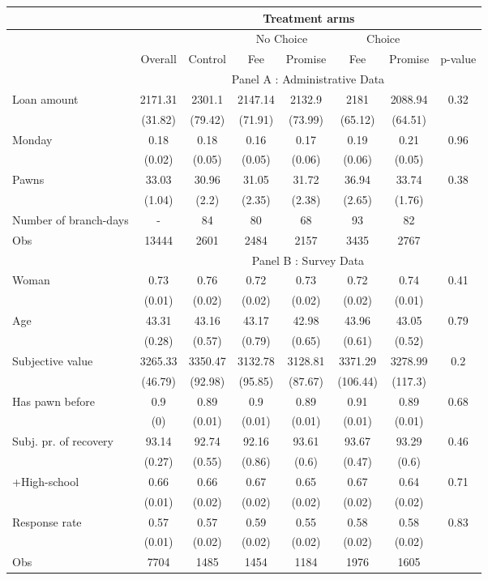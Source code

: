 \begin{tabular}{lccccccc}
\toprule
      &       & \multicolumn{5}{c}{Treatment arms}    &  \\
\midrule
      &       &       & \multicolumn{2}{c}{No Choice } & \multicolumn{2}{c}{Choice} &  \\
\midrule
\midrule
      & Overall & Control & Fee   & Promise & Fee   & Promise & p-value \\
\midrule
      & \multicolumn{7}{c}{Panel A : Administrative Data} \\
\midrule
\midrule
Loan amount  & 2171.31 & 2301.1 & 2147.14 & 2132.9 & 2181  & 2088.94 & 0.32 \\
      & (31.82) & (79.42) & (71.91) & (73.99) & (65.12) & (64.51) &  \\
Monday & 0.18  & 0.18  & 0.16  & 0.17  & 0.19  & 0.21  & 0.96 \\
      & (0.02) & (0.05) & (0.05) & (0.06) & (0.06) & (0.05) &  \\
Pawns & 33.03 & 30.96 & 31.05 & 31.72 & 36.94 & 33.74 & 0.38 \\
      & (1.04) & (2.2) & (2.35) & (2.38) & (2.65) & (1.76) &  \\
\midrule
Number of branch-days & -     & 84    & 80    & 68    & 93    & 82    &  \\
Obs   & 13444 & 2601  & 2484  & 2157  & 3435  & 2767  &  \\
\midrule
      & \multicolumn{7}{c}{Panel B : Survey Data} \\
\midrule
\midrule
Woman & 0.73  & 0.76  & 0.72  & 0.73  & 0.72 & 0.74  & 0.41 \\
      & (0.01) & (0.02) & (0.02) & (0.02) & (0.02) & (0.01) &  \\
Age   & 43.31 & 43.16 & 43.17 & 42.98 & 43.96 & 43.05 & 0.79 \\
      & (0.28) & (0.57) & (0.79) & (0.65) & (0.61) & (0.52) &  \\
Subjective value & 3265.33 & 3350.47 & 3132.78 & 3128.81 & 3371.29 & 3278.99 & 0.2 \\
      & (46.79) & (92.98) & (95.85) & (87.67) & (106.44) & (117.3) &  \\
Has pawn before & 0.9   & 0.89  & 0.9   & 0.89  & 0.91  & 0.89  & 0.68 \\
      & (0)   & (0.01) & (0.01) & (0.01) & (0.01) & (0.01) &  \\
Subj. pr. of recovery & 93.14 & 92.74 & 92.16 & 93.61 & 93.67 & 93.29 & 0.46 \\
      & (0.27) & (0.55) & (0.86) & (0.6) & (0.47) & (0.6) &  \\
+High-school & 0.66  & 0.66  & 0.67  & 0.65  & 0.67  & 0.64  & 0.71 \\
      & (0.01) & (0.02) & (0.02) & (0.02) & (0.02) & (0.02) &  \\
Response rate & 0.57  & 0.57  & 0.59  & 0.55  & 0.58  & 0.58  & 0.83 \\
      & (0.01) & (0.02) & (0.02) & (0.02) & (0.02) & (0.02) &  \\
\midrule
Obs   & 7704  & 1485  & 1454  & 1184  & 1976  & 1605  &  \\
\bottomrule
\bottomrule
\end{tabular}%
